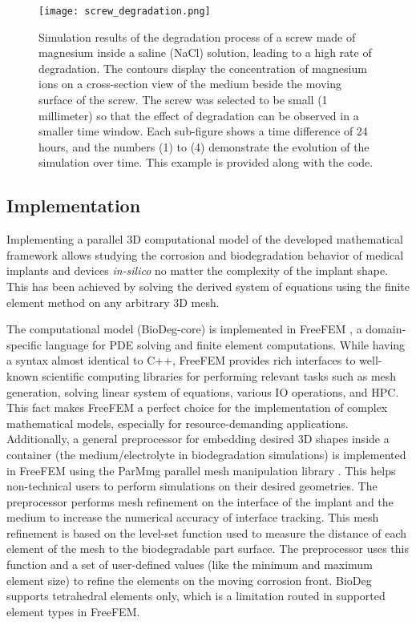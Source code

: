 \begin{figure}[h]
\centering
\medskip
\texttt{[image: screw\_degradation.png]}
\caption[Simulation result of degradation of a screw performed using BioDeg]{Simulation results of the degradation process of a screw made of magnesium inside a saline (NaCl) solution, leading to a high rate of degradation. The contours display the concentration of magnesium ions on a cross-section view of the medium beside the moving surface of the screw. The screw was selected to be small (1 millimeter) so that the effect of degradation can be observed in a smaller time window. Each sub-figure shows a time difference of 24 hours, and the numbers (1) to (4) demonstrate the evolution of the simulation over time. This example is provided along with the code.} \label{fig:screw_biodeg}
\end{figure}

\subsection{Implementation}

Implementing a parallel 3D computational model of the developed mathematical framework allows studying the corrosion and biodegradation behavior of medical implants and devices \textit{in-silico} no matter the complexity of the implant shape. This has been achieved by solving the derived system of equations using the finite element method on any arbitrary 3D mesh.

The computational model (BioDeg-core) is implemented in FreeFEM \cite{Hecht2012}, a domain-specific language for \gls{PDE} solving and finite element computations. While having a syntax almost identical to C++, FreeFEM provides rich interfaces to well-known scientific computing libraries for performing relevant tasks such as mesh generation, solving linear system of equations, various \gls{IO} operations, and \gls{HPC}. This fact makes FreeFEM a perfect choice for the implementation of complex mathematical models, especially for resource-demanding applications. Additionally, a general preprocessor for embedding desired 3D shapes inside a container (the medium/electrolyte in biodegradation simulations) is implemented in FreeFEM using the ParMmg parallel mesh manipulation library \cite{Dapogny2014}. This helps non-technical users to perform simulations on their desired geometries. The preprocessor performs mesh refinement on the interface of the implant and the medium to increase the numerical accuracy of interface tracking. This mesh refinement is based on the level-set function used to measure the distance of each element of the mesh to the biodegradable part surface. The preprocessor uses this function and a set of user-defined values (like the minimum and maximum element size) to refine the elements on the moving corrosion front. BioDeg supports tetrahedral elements only, which is a limitation routed in supported element types in FreeFEM.

